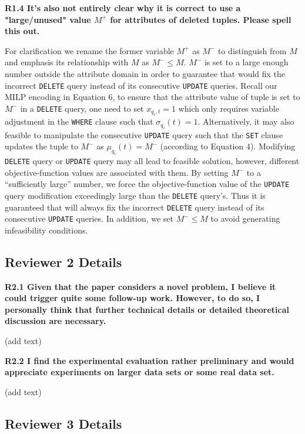 \noindent \textbf{R1.4 It's also not entirely clear why it is correct to use a "large/unused" value $M^+$ for attributes of deleted tuples. Please spell this out.}

For clarification we rename the former variable $M^+$ as $M^-$ to distinguish from $M$ and emphasis its relationship with $M$ as $M^- \leq M$. 
$M^-$ is set to a large enough number outside the attribute domain in order to guarantee that \sys would fix the incorrect \texttt{DELETE} query instead of its consecutive \texttt{UPDATE} queries. Recall our MILP encoding in Equation 6, to ensure that the attribute value of tuple is set to $M^-$ in a \texttt{DELETE} query, one need to set $x_{q_i,t} = 1$ which only requires variable adjustment in the \texttt{WHERE} clause such that $\sigma_{q_i}(t) = 1$. Alternatively, it may also feasible to manipulate the consecutive \texttt{UPDATE} query such that the \texttt{SET} clause updates the tuple to $M^-$ as $\mu_{q_i}(t) = M^-$ (according to Equation 4). Modifying \texttt{DELETE} query or \texttt{UPDATE} query may all lead to feasible solution, however, different objective-function values are associated with them. By setting $M^-$ to a ``sufficiently large'' number, we force the objective-function value of the \texttt{UPDATE} query modification exceedingly large than the \texttt{DELETE} query's. Thus it is  guaranteed that \sys will always fix the incorrect \texttt{DELETE} query instead of its consecutive \texttt{UPDATE} queries. In addition, we set $M^- \leq M$ to avoid generating infeasibility conditions.

\subsection*{Reviewer 2 Details} 

\noindent \textbf{R2.1 Given that the paper considers a novel problem, I believe it could trigger quite some follow-up work. However, to do so, I personally think that further technical details or detailed theoretical discussion are necessary. }

(add text)

\noindent \textbf{R2.2 I find the experimental evaluation rather preliminary and would appreciate experiments on larger data sets or some real data set.}

(add text)
\subsection*{Reviewer 3 Details}

